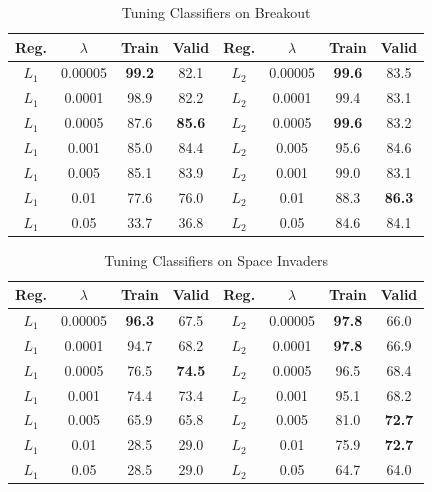 \documentclass[letterpaper, 10pt, conference]{ieeeconf}
\begin{document}
\begin{table}[!t]
\renewcommand{\arraystretch}{1.3}
\caption{Tuning Classifiers on Breakout}
\label{tab:breakout}
\centering
\begin{tabular}{c c c c | c c c c}
\hline
Reg.  & $\lambda$ & Train & Valid & Reg.  & $\lambda$ & Train & Valid \\
\hline
$L_1$ & 0.00005   & \textbf{99.2}  & 82.1  & $L_2$ & 0.00005   & \textbf{99.6}  & 83.5 \\
$L_1$ & 0.0001    & 98.9  & 82.2  & $L_2$ & 0.0001    & 99.4  & 83.1 \\
$L_1$ & 0.0005    & 87.6  & \textbf{85.6}  & $L_2$ & 0.0005    & \textbf{99.6}  & 83.2 \\
$L_1$ & 0.001     & 85.0  & 84.4  & $L_2$ & 0.005     & 95.6  & 84.6 \\
$L_1$ & 0.005     & 85.1  & 83.9  & $L_2$ & 0.001     & 99.0  & 83.1 \\
$L_1$ & 0.01      & 77.6  & 76.0  & $L_2$ & 0.01      & 88.3  & \textbf{86.3} \\
$L_1$ & 0.05      & 33.7  & 36.8  & $L_2$ & 0.05      & 84.6  & 84.1 \\
\hline
\end{tabular}
\end{table}

\begin{table}[!t]
\renewcommand{\arraystretch}{1.3}
\caption{Tuning Classifiers on Space Invaders}
\label{tab:space_invaders}
\centering
\begin{tabular}{c c c c | c c c c}
\hline
Reg.  & $\lambda$ & Train & Valid & Reg.  & $\lambda$ & Train & Valid \\
\hline
$L_1$ & 0.00005   & \textbf{96.3}  & 67.5  & $L_2$ & 0.00005   & \textbf{97.8}  & 66.0 \\
$L_1$ & 0.0001    & 94.7  & 68.2  & $L_2$ & 0.0001    & \textbf{97.8}  & 66.9 \\
$L_1$ & 0.0005    & 76.5  & \textbf{74.5}  & $L_2$ & 0.0005    & 96.5  & 68.4 \\
$L_1$ & 0.001     & 74.4  & 73.4  & $L_2$ & 0.001     & 95.1  & 68.2 \\
$L_1$ & 0.005     & 65.9  & 65.8  & $L_2$ & 0.005     & 81.0  & \textbf{72.7} \\
$L_1$ & 0.01      & 28.5  & 29.0  & $L_2$ & 0.01      & 75.9  & \textbf{72.7} \\
$L_1$ & 0.05      & 28.5  & 29.0  & $L_2$ & 0.05      & 64.7  & 64.0 \\
\hline
\end{tabular}
\end{table}
\end{document}
